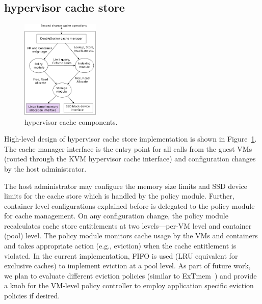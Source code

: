\subsection{\dd{} hypervisor cache store}
\begin{figure}[t]
  \centering
\includegraphics[width=0.33\textwidth]{images/ddecker} 
 \caption{\dd{} hypervisor cache components. 
  }%
 \vspace{-0.5cm} 
 \label{fig:cachestore} 
\end{figure}
%
High-level design of \dd{} hypervisor cache store implementation 
is shown in Figure~\ref{fig:cachestore}.
%
The \dd{} cache manager interface is the entry point for all 
calls from the guest VMs (routed through the KVM hypervisor
cache interface) and configuration changes by the host administrator.
%

The host administrator may configure the memory size limits and SSD device 
limits for the \dd{} cache store which is handled by the
policy module.
%
Further, container level configurations explained before is
delegated to the policy module for cache management. 
%
On any configuration change, the policy module recalculates cache store
entitlements at two levels---per-VM level and container (pool) level.
%
The policy module monitors \dd{} cache usage by the VMs and containers and
takes appropriate action (e.g., eviction) when the cache entitlement is
violated.
%
In the current implementation, FIFO is used (LRU equivalent for exclusive caches)
to implement eviction at a pool level.
%
As part of future work, we plan to evaluate different eviction policies
(similar to ExTmem~\cite{extmem}) and provide a knob for 
the VM-level policy controller to employ application specific eviction
policies if desired.
 
%


